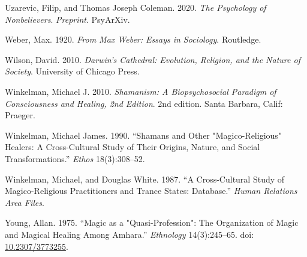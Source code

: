 \documentclass[
  11pt,
]{article}
\begin{document}
\leavevmode\hypertarget{ref-uzarevicPsychologyNonbelievers2020}{}%
Uzarevic, Filip, and Thomas Joseph Coleman. 2020. \emph{The Psychology of Nonbelievers}. \emph{Preprint}. PsyArXiv.

\leavevmode\hypertarget{ref-weber2009max}{}%
Weber, Max. 1920. \emph{From Max Weber: Essays in Sociology}. Routledge.

\leavevmode\hypertarget{ref-wilson2010darwin}{}%
Wilson, David. 2010. \emph{Darwin's Cathedral: Evolution, Religion, and the Nature of Society}. University of Chicago Press.

\leavevmode\hypertarget{ref-winkelmanShamanismBiopsychosocialParadigm2010}{}%
Winkelman, Michael J. 2010. \emph{Shamanism: A Biopsychosocial Paradigm of Consciousness and Healing, 2nd Edition}. 2nd edition. Santa Barbara, Calif: Praeger.

\leavevmode\hypertarget{ref-winkelmanShamansOtherMagicoReligious1990}{}%
Winkelman, Michael James. 1990. ``Shamans and Other "Magico-Religious" Healers: A Cross-Cultural Study of Their Origins, Nature, and Social Transformations.'' \emph{Ethos} 18(3):308--52.

\leavevmode\hypertarget{ref-winkelmanCrossculturalStudyMagicoreligious}{}%
Winkelman, Michael, and Douglas White. 1987. ``A Cross-Cultural Study of Magico-Religious Practitioners and Trance States: Database.'' \emph{Human Relations Area Files}.

\leavevmode\hypertarget{ref-youngMagicQuasiProfessionOrganization1975}{}%
Young, Allan. 1975. ``Magic as a "Quasi-Profession": The Organization of Magic and Magical Healing Among Amhara.'' \emph{Ethnology} 14(3):245--65. doi: \href{https://doi.org/10.2307/3773255}{10.2307/3773255}.
\end{document}
